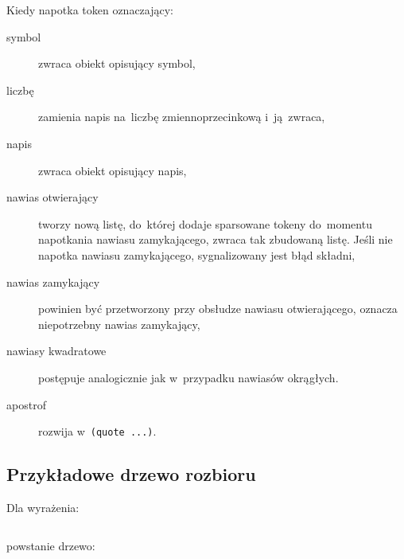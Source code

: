 \documentclass[a4paper,11pt]{article}
\newcommand{\clj}[1]{
\inputminted[fontsize=\footnotesize,frame=single,samepage=true]{clojure}{code/#1.clj}
}
\begin{document}
Kiedy napotka token oznaczający:
\begin{description}
\item[symbol] zwraca obiekt opisujący symbol,
\item[liczbę] zamienia napis na~liczbę zmiennoprzecinkową i~ją~zwraca,
\item[napis] zwraca obiekt opisujący napis,
\item[nawias otwierający] tworzy nową listę, do~której dodaje sparsowane tokeny
  do~momentu napotkania nawiasu zamykającego, zwraca tak zbudowaną listę. Jeśli
  nie napotka nawiasu zamykającego, sygnalizowany jest błąd składni,
\item[nawias zamykający] powinien być przetworzony przy obsłudze nawiasu
  otwierającego, oznacza niepotrzebny nawias zamykający,
\item[nawiasy kwadratowe] postępuje analogicznie jak w~przypadku nawiasów
  okrągłych.
\item[apostrof] rozwija w~\verb+(quote ...)+.
\end{description}

\subsection{Przykładowe drzewo rozbioru}

Dla wyrażenia:
\clj{fact}

powstanie drzewo:


\end{document}
